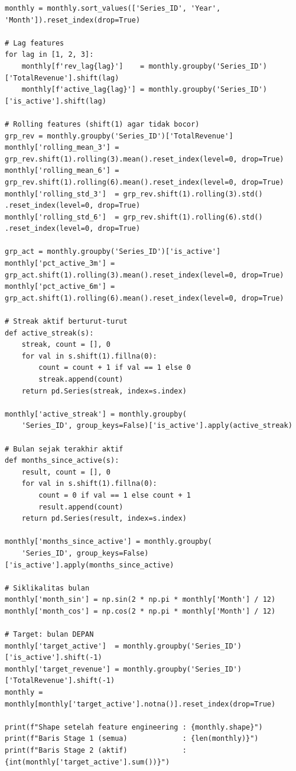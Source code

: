 \begin{lstlisting}[style=pycode,caption={Lag features, rolling features, dan streak aktif}]
monthly = monthly.sort_values(['Series_ID', 'Year', 'Month']).reset_index(drop=True)

# Lag features
for lag in [1, 2, 3]:
    monthly[f'rev_lag{lag}']    = monthly.groupby('Series_ID')['TotalRevenue'].shift(lag)
    monthly[f'active_lag{lag}'] = monthly.groupby('Series_ID')['is_active'].shift(lag)

# Rolling features (shift(1) agar tidak bocor)
grp_rev = monthly.groupby('Series_ID')['TotalRevenue']
monthly['rolling_mean_3'] = grp_rev.shift(1).rolling(3).mean().reset_index(level=0, drop=True)
monthly['rolling_mean_6'] = grp_rev.shift(1).rolling(6).mean().reset_index(level=0, drop=True)
monthly['rolling_std_3']  = grp_rev.shift(1).rolling(3).std() .reset_index(level=0, drop=True)
monthly['rolling_std_6']  = grp_rev.shift(1).rolling(6).std() .reset_index(level=0, drop=True)

grp_act = monthly.groupby('Series_ID')['is_active']
monthly['pct_active_3m'] = grp_act.shift(1).rolling(3).mean().reset_index(level=0, drop=True)
monthly['pct_active_6m'] = grp_act.shift(1).rolling(6).mean().reset_index(level=0, drop=True)

# Streak aktif berturut-turut
def active_streak(s):
    streak, count = [], 0
    for val in s.shift(1).fillna(0):
        count = count + 1 if val == 1 else 0
        streak.append(count)
    return pd.Series(streak, index=s.index)

monthly['active_streak'] = monthly.groupby(
    'Series_ID', group_keys=False)['is_active'].apply(active_streak)

# Bulan sejak terakhir aktif
def months_since_active(s):
    result, count = [], 0
    for val in s.shift(1).fillna(0):
        count = 0 if val == 1 else count + 1
        result.append(count)
    return pd.Series(result, index=s.index)

monthly['months_since_active'] = monthly.groupby(
    'Series_ID', group_keys=False)['is_active'].apply(months_since_active)

# Siklikalitas bulan
monthly['month_sin'] = np.sin(2 * np.pi * monthly['Month'] / 12)
monthly['month_cos'] = np.cos(2 * np.pi * monthly['Month'] / 12)

# Target: bulan DEPAN
monthly['target_active']  = monthly.groupby('Series_ID')['is_active'].shift(-1)
monthly['target_revenue'] = monthly.groupby('Series_ID')['TotalRevenue'].shift(-1)
monthly = monthly[monthly['target_active'].notna()].reset_index(drop=True)

print(f"Shape setelah feature engineering : {monthly.shape}")
print(f"Baris Stage 1 (semua)             : {len(monthly)}")
print(f"Baris Stage 2 (aktif)             : {int(monthly['target_active'].sum())}")
\end{lstlisting}

